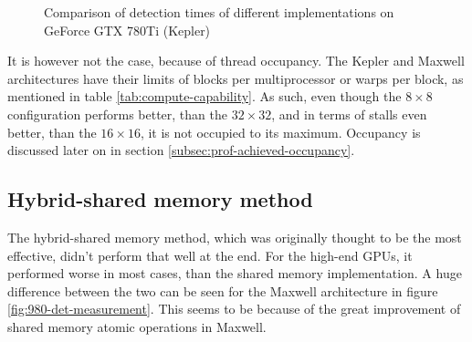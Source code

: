 \begin{figure}[ht]
\centering{}
	\caption{Comparison of detection times of different implementations on GeForce GTX 780Ti (Kepler)}
	\label{fig:780ti-det-measurement}
\end{figure}

It is however not the case, because of thread occupancy. The Kepler and Maxwell architectures have their limits of blocks per multiprocessor or warps per block, as mentioned in table \ref{tab:compute-capability}. As such, even though the $8 \times 8$ configuration performs better, than the $32 \times 32$, and in terms of stalls even better, than the $16 \times 16$, it is not occupied to its maximum. Occupancy is discussed later on in section \ref{subsec:prof-achieved-occupancy}.

\subsection{Hybrid-shared memory method}

The hybrid-shared memory method, which was originally thought to be the most effective, didn't perform that well at the end. For the high-end GPUs, it performed worse in most cases, than the shared memory implementation. A huge difference between the two can be seen for the Maxwell architecture in figure \ref{fig:980-det-measurement}. This seems to be because of the great improvement of shared memory atomic operations in Maxwell.

